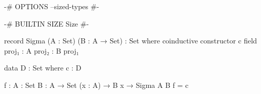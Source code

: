 \documentclass{article}
\begin{document}
\begin{code}
{-# OPTIONS --sized-types #-}

{-# BUILTIN SIZE Size #-}

record Sigma (A : Set) (B : A → Set) : Set where
  coinductive
  constructor c
  field
    proj₁ : A
    proj₂ : B proj₁

data D : Set where
  c : D

f : {A : Set} {B : A → Set} (x : A) → B x → Sigma A B
f = c
\end{code}
\end{document}
